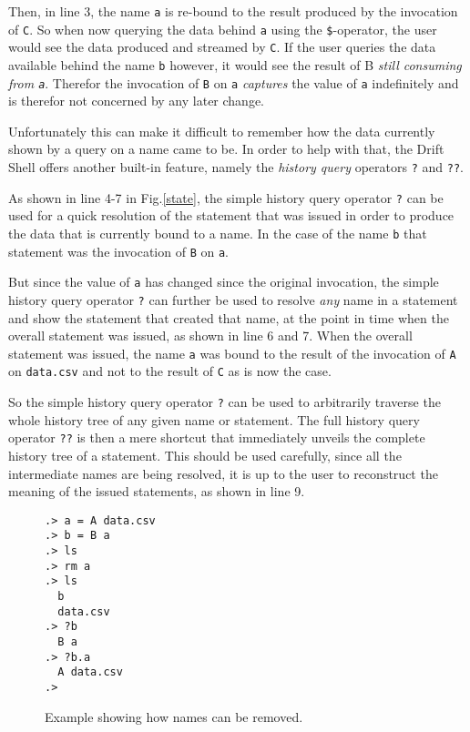 Then, in line 3, the name \texttt{a} is re-bound to the result
produced by the invocation of \texttt{C}. So when now querying
the data behind \texttt{a} using the \texttt{\$}-operator, the
user would see the data produced and streamed by \texttt{C}.
If the user queries the data available behind the name \texttt{b}
however, it would see the result of B \textit{still consuming
from \texttt{a}}. Therefor the invocation of \texttt{B} on \texttt{a}
\textit{captures} the value of \texttt{a} indefinitely and is therefor
not concerned by any later change.
\newline

Unfortunately this can make it difficult to remember how the data
currently shown by a query on a name came to be.
In order to help with that, the Drift Shell offers another built-in
feature, namely the \textit{history query} operators \texttt{?} and
\texttt{??}.

As shown in line 4-7 in Fig.\ref{state}, the simple history query
operator \texttt{?} can be used for a quick resolution of the
statement that was issued in order to produce the data that is
currently bound to a name. In the case of the name \texttt{b}
that statement was the invocation of \texttt{B} on \texttt{a}.

But since the value of \texttt{a} has changed since the original
invocation, the simple history query operator \texttt{?} can further
be used to resolve \textit{any} name in a statement and show the
statement that created that name, at the point in time when the
overall statement was issued, as shown in line 6 and 7. When
the overall statement was issued, the name \texttt{a} was bound
to the result of the invocation of \texttt{A} on \texttt{data.csv}
and not to the result of \texttt{C} as is now the case.

So the simple history query operator \texttt{?} can be used to
arbitrarily traverse the whole history tree of any given name
or statement. The full history query operator \texttt{??} is then
a mere shortcut that immediately unveils the complete history tree
of a statement. This should be used carefully, since
all the intermediate names are being resolved, it is up to the
user to reconstruct the meaning of the issued statements, as shown
in line 9.
\newline

\begin{wrapfigure}{l}{0.4\textwidth}
  \begin{lstlisting}
.> a = A data.csv
.> b = B a
.> ls
.> rm a
.> ls
  b
  data.csv
.> ?b
  B a
.> ?b.a
  A data.csv
.>
  \end{lstlisting}
  \caption{Example showing how names can be removed.}
  \label{remove}
\end{wrapfigure}

